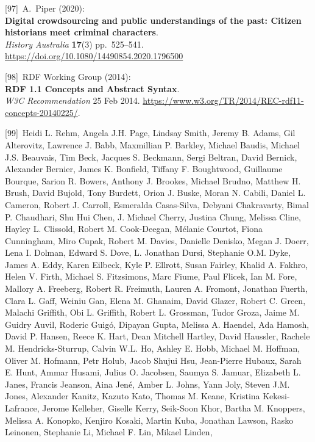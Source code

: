 {[}97{]}~A.~Piper (2020):\\
\textbf{Digital crowdsourcing and public understandings of the past:
Citizen historians meet criminal characters}.\\
\emph{History Australia} \textbf{17}(3) pp.~525--541.\\
\url{https://doi.org/10.1080/14490854.2020.1796500}

{[}98{]}~RDF Working Group (2014):\\
\textbf{RDF 1.1 Concepts and Abstract Syntax}.\\
\emph{W3C Recommendation} 25 Feb 2014.
\url{https://www.w3.org/TR/2014/REC-rdf11-concepts-20140225/}.

{[}99{]}~Heidi L. Rehm, Angela J.H. Page, Lindsay Smith, Jeremy B.
Adams, Gil Alterovitz, Lawrence J. Babb, Maxmillian P. Barkley, Michael
Baudis, Michael J.S. Beauvais, Tim Beck, Jacques S. Beckmann, Sergi
Beltran, David Bernick, Alexander Bernier, James K. Bonfield, Tiffany F.
Boughtwood, Guillaume Bourque, Sarion R. Bowers, Anthony J. Brookes,
Michael Brudno, Matthew H. Brush, David Bujold, Tony Burdett, Orion J.
Buske, Moran N. Cabili, Daniel L. Cameron, Robert J. Carroll, Esmeralda
Casas-Silva, Debyani Chakravarty, Bimal P. Chaudhari, Shu Hui Chen, J.
Michael Cherry, Justina Chung, Melissa Cline, Hayley L. Clissold, Robert
M. Cook-Deegan, Mélanie Courtot, Fiona Cunningham, Miro Cupak, Robert M.
Davies, Danielle Denisko, Megan J. Doerr, Lena I. Dolman, Edward S.
Dove, L. Jonathan Dursi, Stephanie O.M. Dyke, James A. Eddy, Karen
Eilbeck, Kyle P. Ellrott, Susan Fairley, Khalid A. Fakhro, Helen V.
Firth, Michael S. Fitzsimons, Marc Fiume, Paul Flicek, Ian M. Fore,
Mallory A. Freeberg, Robert R. Freimuth, Lauren A. Fromont, Jonathan
Fuerth, Clara L. Gaff, Weiniu Gan, Elena M. Ghanaim, David Glazer,
Robert C. Green, Malachi Griffith, Obi L. Griffith, Robert L. Grossman,
Tudor Groza, Jaime M. Guidry Auvil, Roderic Guigó, Dipayan Gupta,
Melissa A. Haendel, Ada Hamosh, David P. Hansen, Reece K. Hart, Dean
Mitchell Hartley, David Haussler, Rachele M. Hendricks-Sturrup, Calvin
W.L. Ho, Ashley E. Hobb, Michael M. Hoffman, Oliver M. Hofmann, Petr
Holub, Jacob Shujui Hsu, Jean-Pierre Hubaux, Sarah E. Hunt, Ammar
Husami, Julius O. Jacobsen, Saumya S. Jamuar, Elizabeth L. Janes,
Francis Jeanson, Aina Jené, Amber L. Johns, Yann Joly, Steven J.M.
Jones, Alexander Kanitz, Kazuto Kato, Thomas M. Keane, Kristina
Kekesi-Lafrance, Jerome Kelleher, Giselle Kerry, Seik-Soon Khor, Bartha
M. Knoppers, Melissa A. Konopko, Kenjiro Kosaki, Martin Kuba, Jonathan
Lawson, Rasko Leinonen, Stephanie Li, Michael F. Lin, Mikael Linden,
